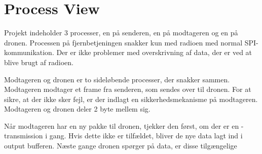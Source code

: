 \documentclass[Main]{subfiles}
\begin{document}
\section{Process View}
Projekt indeholder 3 processer, en på senderen, en på modtageren og en på dronen.
Processen på fjernbetjeningen snakker kun med radioen med normal SPI-kommunikation. 
Der er ikke problemer med overskrivning af data, der er ved at blive brugt af radioen.

Modtageren og dronen er to sideløbende processer, der snakker sammen.
Modtageren modtager et frame fra senderen, som sendes over \itoc til dronen.
For at sikre, at der ikke sker fejl, er der indlagt en sikkerhedsmekanisme på modtageren. 
Modtageren og dronen deler 2 byte mellem sig.

Når modtageren har en ny pakke til dronen, tjekker den først, om der er en \itoc-transmission i gang. 
Hvis dette ikke er tilfældet, bliver de nye data lagt ind i output bufferen. 
Næste gange dronen spørger på data, er disse tilgængelige
\end{document}
